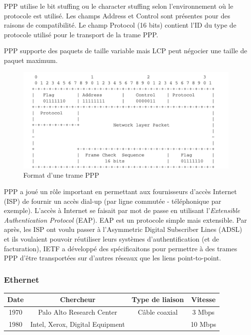	PPP utilise le bit stuffing ou le character stuffing selon l'environnement où le protocole est utilisé. Les champs Address et Control sont présentes pour des raisons de compatibilité. Le champ Protocol (16 bits) contient l'ID du type de protocole utilisé pour le transport de la trame PPP. 
	
	PPP supporte des paquets de taille variable mais LCP peut négocier une taille de paquet maximum.
	
	\begin{figure}[!ht]
	    \begin{center}
		\includegraphics{ppp_frame_format.png}
		\caption{Format d'une trame PPP}
	    \end{center}
	\end{figure}
	
	PPP a joué un rôle important en permettant aux fournisseurs d'accès Internet (ISP) de fournir un accès dial-up (par ligne commutée - téléphonique par exemple). L'accès à Internet se faisait par mot de passe en utilisant l'\textit{Extensible Authentication Protocol} (EAP). EAP est un protocole simple mais extensible. Par après, les ISP ont voulu passer à l'Asymmetric Digital Subscriber Lines (ADSL) et ils voulaient pouvoir réutiliser leurs systèmes d'authentification (et de facturation), IETF a développé des spécificaitons pour permettre à des trames PPP d'être transportées sur d'autres réseaux que les liens point-to-point.
	
\subsubsection{Ethernet}

   \begin{center}
    \begin{tabular}{c|c|c|c}
     Date & Chercheur & Type de liaison & Vitesse \\
     \hline
     1970 & Palo Alto Research Center & Câble coaxial & 3 Mbps \\
     1980 & Intel, Xerox, Digital Equipment & & 10 Mbps \\
    \end{tabular}
   \end{center}
   
